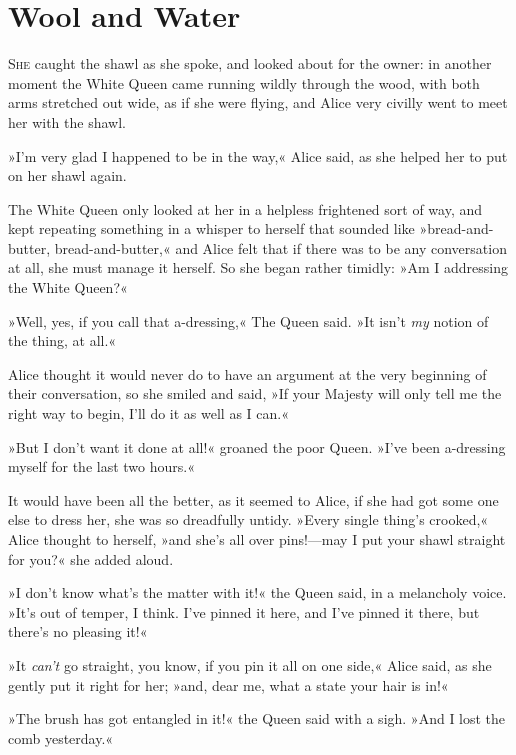 \chapter{Wool and Water}

\lettrine[lines=4]{S}{he} caught the shawl as she spoke, and looked about for the owner: in another moment the White Queen came running wildly through the wood, with both arms stretched out wide, as if she were flying, and Alice very civilly went to meet her with the shawl.

\label{white3}
\label{black2}

»I'm very glad I happened to be in the way,« Alice said, as she helped her to put on her shawl again.

The White Queen only looked at her in a helpless frightened sort of way, and kept repeating something in a whisper to herself that sounded like »bread-and-butter, bread-and-butter,« and Alice felt that if there was to be any conversation at all, she must manage it herself. So she began rather timidly: »Am I addressing the White Queen?«

»Well, yes, if you call that a-dressing,« The Queen said. »It isn't \textit{my} notion of the thing, at all.«

Alice thought it would never do to have an argument at the very beginning of their conversation, so she smiled and said, »If your Majesty will only tell me the right way to begin, I'll do it as well as I can.«

»But I don't want it done at all!« groaned the poor Queen. »I've been a-dressing myself for the last two hours.«

It would have been all the better, as it seemed to Alice, if she had got some one else to dress her, she was so dreadfully untidy. »Every single thing's crooked,« Alice thought to herself, »and she's all over pins!—may I put your shawl straight for you?« she added aloud.

»I don't know what's the matter with it!« the Queen said, in a melancholy voice. »It's out of temper, I think. I've pinned it here, and I've pinned it there, but there's no pleasing it!«

»It \textit{can't} go straight, you know, if you pin it all on one side,« Alice said, as she gently put it right for her; »and, dear me, what a state your hair is in!«

»The brush has got entangled in it!« the Queen said with a sigh. »And I lost the comb yesterday.«

